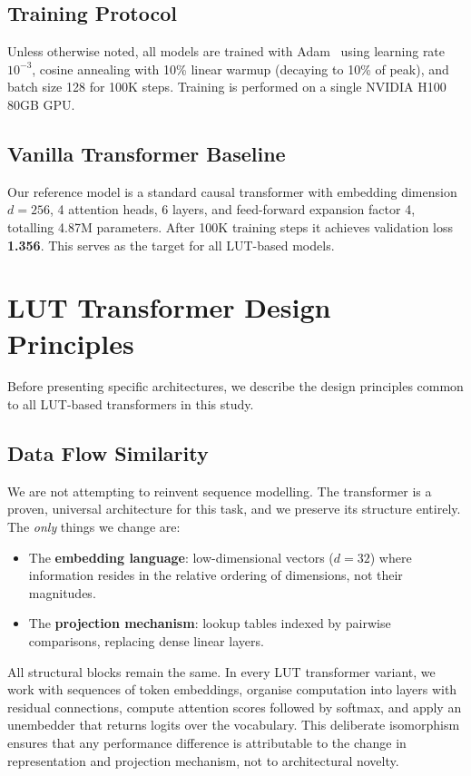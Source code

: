 \documentclass[11pt]{article}
\begin{document}
\subsection{Training Protocol}

Unless otherwise noted, all models are trained with Adam~\cite{ref:adam} using learning rate $10^{-3}$, cosine annealing with 10\% linear warmup (decaying to 10\% of peak), and batch size 128 for 100K steps.
Training is performed on a single NVIDIA H100 80GB GPU.

\subsection{Vanilla Transformer Baseline}

Our reference model is a standard causal transformer with embedding dimension $d = 256$, 4 attention heads, 6 layers, and feed-forward expansion factor 4, totalling 4.87M parameters.
After 100K training steps it achieves validation loss \textbf{1.356}.
This serves as the target for all LUT-based models.


\section{LUT Transformer Design Principles}
\label{sec:design}

Before presenting specific architectures, we describe the design principles common to all LUT-based transformers in this study.

\subsection{Data Flow Similarity}

We are not attempting to reinvent sequence modelling.
The transformer is a proven, universal architecture for this task, and we preserve its structure entirely.
The \emph{only} things we change are:
\begin{itemize}
    \item The \textbf{embedding language}: low-dimensional vectors ($d = 32$) where information resides in the relative ordering of dimensions, not their magnitudes.
    \item The \textbf{projection mechanism}: lookup tables indexed by pairwise comparisons, replacing dense linear layers.
\end{itemize}

All structural blocks remain the same.
In every LUT transformer variant, we work with sequences of token embeddings, organise computation into layers with residual connections, compute attention scores followed by softmax, and apply an unembedder that returns logits over the vocabulary.
This deliberate isomorphism ensures that any performance difference is attributable to the change in representation and projection mechanism, not to architectural novelty.
\end{document}
